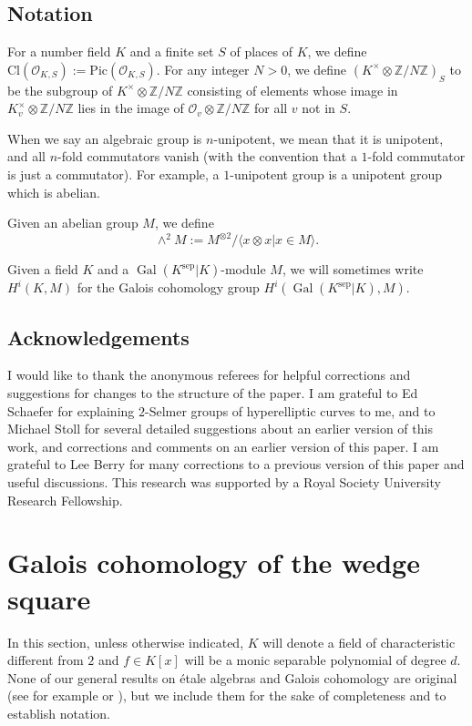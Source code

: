 \documentclass[11pt]{amsart}
\def\Z{\mathbb Z}
\theoremstyle{plain}
\theoremstyle{definition}
\DeclareMathOperator{\Gal}{Gal}
\newcommand{\Cl}{\mathrm{Cl}}
\newcommand{\Pic}{\mathrm{Pic}}
\newcommand{\sep}{\mathrm{sep}}
\begin{document}
\subsection{Notation}
For a number field $K$ and a finite set $S$ of places of $K$, we define $\Cl (\mathcal{O}_{K,S}):=\Pic (\mathcal{O}_{K,S})$. For any integer $N>0$, we define $(K^\times \otimes \mathbb{Z}/N\mathbb{Z})_S $ to be the subgroup of $K^\times \otimes\mathbb{Z}/N\mathbb{Z}$ consisting of elements whose image in $K_v ^\times \otimes \mathbb{Z}/N\mathbb{Z}$ lies in the image of $\mathcal{O}_v \otimes \mathbb{Z}/N\Z $ for all $v$ not in $S$.

When we say an algebraic group is $n$-unipotent, we mean that it is unipotent, and all $n$-fold commutators vanish (with the convention that a $1$-fold commutator is just a commutator). For example, a $1$-unipotent group is a unipotent group which is abelian.

Given an abelian group $M$, we define
\[
\wedge ^2 M:= M^{\otimes 2}/\langle x\otimes x |x\in M \rangle .
\]

Given a field $K$ and a $\Gal (K^{\sep }|K)$-module $M$, we will sometimes write $H^i (K,M)$ for the Galois cohomology group $H^i (\Gal (K^{\sep }|K),M)$.
\subsection*{Acknowledgements}
I would like to thank the anonymous referees for helpful corrections and suggestions for changes to the structure of the paper. I am grateful to Ed Schaefer for explaining $2$-Selmer groups of hyperelliptic curves to me, and to Michael Stoll for several detailed suggestions about an earlier version of this work, and corrections and comments on an earlier version of this paper. I am grateful to Lee Berry for many corrections to a previous version of this paper and useful discussions. This research was supported by a Royal Society University Research Fellowship.
\section{Galois cohomology of the wedge square}\label{sec:shapiro}
In this section, unless otherwise indicated, $K$ will denote a field of characteristic different from $2$ and $f\in K[x]$ will be a monic separable polynomial of degree $d$. None of our general results on \'etale algebras and Galois cohomology are original (see for example \cite{BPS} or \cite{SS}), but we include them for the sake of completeness and to establish notation.
\end{document}
